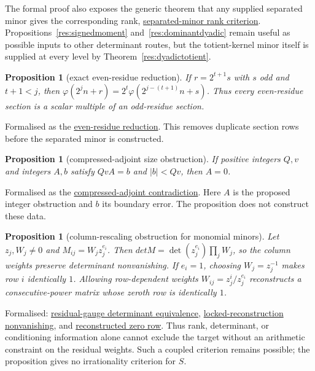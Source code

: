 \documentclass[11pt]{article}
\newcommand{\commit}{312b96c0d149ed466725c62d4ef24cfc91bca34e}
\newcommand{\repobase}{https://github.com/wcook04/plectis-lean-erdos249-257/blob/\commit}
\newcommand{\PK}{Erdos249257}
\newcommand{\lword}[4]{\href{\repobase/\PK/#1\#L#2}{#4}}
\newtheorem{proposition}[theorem]{Proposition}
\theoremstyle{definition}
\theoremstyle{remark}
\newcommand{\ph}{\varphi}
\begin{document}
{The formal proof also exposes the generic theorem that any supplied separated
minor gives the corresponding rank,
\lword{TotientMahlerDefect.lean}{101}{finrank_canonicalTotientKernel_eq_of_certificate}{separated-minor rank criterion}.
Propositions~\ref{res:signedmoment} and~\ref{res:dominantdyadic} remain useful
as possible inputs to other determinant routes, but the totient-kernel minor
itself is supplied at every level by Theorem~\ref{res:dyadictotient}.

\begin{proposition}[exact even-residue reduction]\label{res:evenresidue}
If $r=2^{t+1}s$ with $s$ odd and $t+1<j$, then
$\ph(2^jn+r)=2^t\ph(2^{j-(t+1)}n+s)$.  Thus every even-residue section is a
scalar multiple of an odd-residue section.
\end{proposition}
\noindent Formalised as the
\lword{TotientMahlerDefect.lean}{159}{totientKernel_even_residue_reduce}{even-residue reduction}.
This removes duplicate section rows before the separated minor is constructed.

\begin{proposition}[compressed-adjoint size obstruction]\label{res:compressedadjoint}
If positive integers $Q,v$ and integers $A,b$ satisfy $QvA=b$ and
$|b|<Qv$, then $A=0$.
\end{proposition}
\noindent Formalised as the
\lword{TotientMahlerDefect.lean}{1051}{false_of_compressedAdjointCertificate}{compressed-adjoint contradiction}.
Here $A$ is the proposed integer obstruction and $b$ its boundary error.  The
proposition does not construct these data.

\begin{proposition}[column-rescaling obstruction for monomial minors]\label{res:residualgauge}
Let $z_j,W_j\ne0$ and $M_{ij}=W_jz_j^{e_i}$.  Then
\(det M=\det(z_j^{e_i})\prod_jW_j\), so the column weights preserve
determinant nonvanishing.  If $e_i=1$, choosing $W_j=z_j^{-1}$ makes row $i$
identically $1$.  Allowing row-dependent weights
$W_{ij}=z_j^i/z_j^{e_i}$ reconstructs a consecutive-power matrix whose
zeroth row is identically $1$.
\end{proposition}
\noindent Formalised:
\lword{ResidualGaugeObstruction.lean}{55}{det_residualMonomialMatrix_ne_zero_iff}{residual-gauge determinant equivalence},
\lword{ResidualGaugeObstruction.lean}{94}{locked_reconstruction_preserves_nonzero_minor}{locked-reconstruction nonvanishing}, and
\lword{ResidualGaugeObstruction.lean}{145}{rowReconstruction_zero_row_one}{reconstructed zero row}.
Thus rank, determinant, or conditioning information alone cannot exclude the
target without an arithmetic constraint on the residual weights.  Such a
coupled criterion remains possible; the proposition gives no irrationality
criterion for $S$.

}
\end{document}
